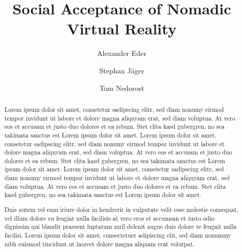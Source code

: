 \documentclass[sigchi]{acmart}
\begin{document}
\title{Social Acceptance of Nomadic Virtual Reality}

\author{Alexander Eder}

\author{Stephan Jäger}

\author{Tom Nedorost}

\renewcommand{\shortauthors}{Eder and Jäger and Nedorost}
\linenumbers

\begin{abstract}
Lorem ipsum dolor sit amet, consetetur sadipscing elitr, sed diam nonumy eirmod tempor invidunt ut labore et dolore magna aliquyam erat, sed diam voluptua. At vero eos et accusam et justo duo dolores et ea rebum. Stet clita kasd gubergren, no sea takimata sanctus est Lorem ipsum dolor sit amet. Lorem ipsum dolor sit amet, consetetur sadipscing elitr, sed diam nonumy eirmod tempor invidunt ut labore et dolore magna aliquyam erat, sed diam voluptua. At vero eos et accusam et justo duo dolores et ea rebum. Stet clita kasd gubergren, no sea takimata sanctus est Lorem ipsum dolor sit amet. Lorem ipsum dolor sit amet, consetetur sadipscing elitr, sed diam nonumy eirmod tempor invidunt ut labore et dolore magna aliquyam erat, sed diam voluptua. At vero eos et accusam et justo duo dolores et ea rebum. Stet clita kasd gubergren, no sea takimata sanctus est Lorem ipsum dolor sit amet. 

Duis autem vel eum iriure dolor in hendrerit in vulputate velit esse molestie consequat, vel illum dolore eu feugiat nulla facilisis at vero eros et accumsan et iusto odio dignissim qui blandit praesent luptatum zzril delenit augue duis dolore te feugait nulla facilisi. Lorem ipsum dolor sit amet, consectetuer adipiscing elit, sed diam nonummy nibh euismod tincidunt ut laoreet dolore magna aliquam erat volutpat. 
\end{abstract}
\end{document}

